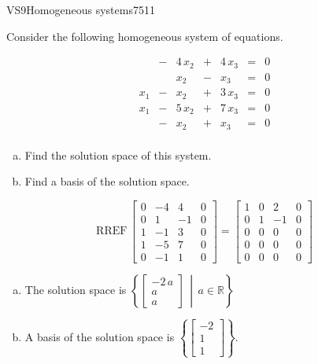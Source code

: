 \begin{exercise}{VS9}{Homogeneous systems}{7511} 
\begin{exerciseStatement} 

Consider the following homogeneous system of equations.

 \[\begin{matrix}
 &  -  & 4 \, x_{2} &  +  & 4 \, x_{3} & = & 0 \\
 &  & x_{2} &  -  & x_{3} & = & 0 \\
 x_{1} &  -  & x_{2} &  +  & 3 \, x_{3} & = & 0 \\
 x_{1} &  -  & 5 \, x_{2} &  +  & 7 \, x_{3} & = & 0 \\
 &  -  & x_{2} &  +  & x_{3} & = & 0 \\
 \end{matrix}\] 

\begin{enumerate}[(a)]
\item  Find the solution space of this system.
\item  Find a basis of the solution space.
\end{enumerate}

     \end{exerciseStatement}
 \begin{exerciseAnswer} 

\[\mathrm{RREF}\,\left[\begin{array}{ccc|c}
0 & -4 & 4 & 0 \\
0 & 1 & -1 & 0 \\
1 & -1 & 3 & 0 \\
1 & -5 & 7 & 0 \\
0 & -1 & 1 & 0
\end{array}\right]=\left[\begin{array}{ccc|c}
1 & 0 & 2 & 0 \\
0 & 1 & -1 & 0 \\
0 & 0 & 0 & 0 \\
0 & 0 & 0 & 0 \\
0 & 0 & 0 & 0
\end{array}\right]\]

 

\begin{enumerate}[(a)]
\item The solution space is \( \left\{ \left[\begin{array}{c}
-2 \, a \\
a \\
a
\end{array}\right] \,\middle|\, a \in\mathbb R \right\} \) 
\item A basis of the solution space is \(\left\{ \left[\begin{array}{c}
-2 \\
1 \\
1
\end{array}\right] \right\}\).
\end{enumerate}

     \end{exerciseAnswer}
 \end{exercise}



